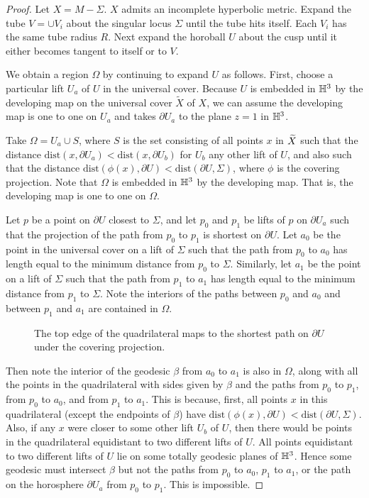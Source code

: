 \begin{proof}
Let $X = M-\Sigma$.  $X$ admits an incomplete hyperbolic metric.
Expand the tube $V = \cup V_i$ about the
singular locus $\Sigma$ until the tube hits itself.  Each $V_i$ has
the same tube radius $R$.  Next expand the horoball $U$ about
the cusp until it either becomes tangent to itself or to $V$.

We obtain a region $\Omega$ by continuing to expand $U$ as follows.
First, choose a particular lift $U_a$ of $U$ in the universal cover.
Because $U$ is embedded in ${\mathbb{H}}^3$ by the developing map on the
universal cover $\widetilde{X}$ of $X$, we can assume the developing
map is one to one on $U_a$ and takes $\partial U_a$ to the plane $z=1$
in ${\mathbb{H}}^3$.

Take $\Omega= U_a \cup S$, where $S$ is the set consisting of all
points $x$ in ${\widetilde{X}}$ such that the distance $\mbox{dist}(x,
\partial U_a) < \mbox{dist}(x, \partial U_b)$ for $U_b$ any other lift
of $U$, and also such that the distance $\mbox{dist}(\phi(x), \partial
U) < \mbox{dist}(\partial U,\Sigma)$, where $\phi$ is the covering
projection. Note that $\Omega$ is embedded in ${\mathbb{H}}^3$ by the
developing map.  That is, the developing map is one to one on
$\Omega$.

Let $p$ be a point on $\partial U$ closest to $\Sigma$, and let $p_0$
and $p_1$ be lifts of $p$ on $\partial U_a$ such that the projection
of the path from $p_0$ to $p_1$ is shortest on $\partial U$.  Let
$a_0$ be the point in the universal cover on a lift of $\Sigma$ such
that the path from $p_0$ to $a_0$ has length equal to the minimum
distance from $p_0$ to $\Sigma$.  Similarly, let $a_1$ be the point on
a lift of $\Sigma$ such that the path from $p_1$ to $a_1$ has length
equal to the minimum distance from $p_1$ to $\Sigma$.  Note the
interiors of the paths between $p_0$ and $a_0$ and between $p_1$ and
$a_1$ are contained in $\Omega$. 

\begin{figure}
  \begin{center}
  
  \end{center}
  \caption{The top edge of the quadrilateral maps to the shortest path
  on $\partial U$ under the covering projection. }
  \label{fig:area-quad}
\end{figure}

Then note the interior of the geodesic $\beta$ from $a_0$ to $a_1$ is
also in $\Omega$, along with all the points in the quadrilateral with
sides given by $\beta$ and the paths from $p_0$ to $p_1$, from $p_0$
to $a_0$, and from $p_1$ to $a_1$.  This is because, first, all points
$x$ in this quadrilateral (except the endpoints of $\beta$) have
$\mbox{dist}(\phi(x), \partial U) < \mbox{dist}(\partial U, \Sigma)$.
Also, if any $x$ were closer to some other lift $U_b$ of $U$, then
there would be points in the quadrilateral equidistant to two
different lifts of $U$.  All points equidistant to two different lifts
of $U$ lie on some totally geodesic planes of ${\mathbb{H}}^3$.  Hence some
geodesic must intersect $\beta$ but not the paths from $p_0$ to $a_0$,
$p_1$ to $a_1$, or the path on the horosphere $\partial U_a$ from
$p_0$ to $p_1$.  This is impossible.


\end{proof}
